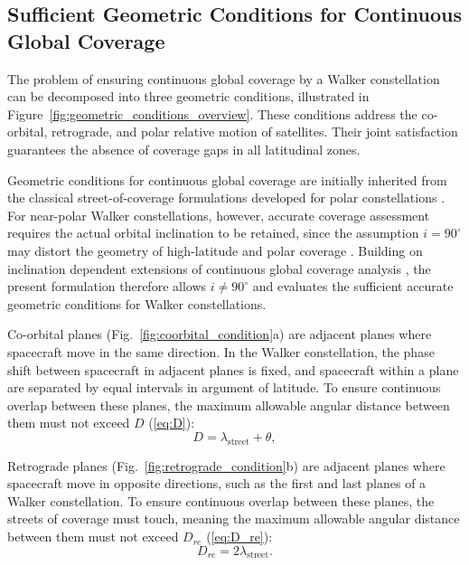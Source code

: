 \subsection{Sufficient Geometric Conditions for Continuous Global Coverage}
\label{subsec:geometric_conditions}

The problem of ensuring continuous global coverage by a Walker constellation can be 
decomposed into three geometric conditions, illustrated in Figure~\ref{fig:geometric_conditions_overview}. 
These conditions address the co-orbital, retrograde, and polar relative motion of satellites. 
Their joint satisfaction guarantees the absence of coverage gaps in all latitudinal zones.

Geometric conditions for continuous global coverage are initially inherited from the classical street-of-coverage formulations developed for polar constellations \cite{beste1978,rider1985, wertz1999smad}. For near-polar Walker constellations, however, accurate coverage assessment requires the actual orbital inclination to be retained, since the assumption \(i=90^\circ\) may distort the geometry of high-latitude and polar coverage \cite{ulybyshev1999,deweck2004}. Building on inclination dependent extensions of continuous global coverage analysis \cite{ulybyshev1999, huang2021}, the present formulation therefore allows \(i\neq90^\circ\) and evaluates the sufficient accurate geometric conditions for Walker constellations.

Co-orbital planes (Fig.~\ref{fig:coorbital_condition}a) are adjacent planes where spacecraft
move in the same direction. In the Walker constellation, the phase shift between spacecraft in
adjacent planes is fixed, and spacecraft within a plane are separated by equal intervals in
argument of latitude. To ensure continuous overlap between these planes, the maximum allowable
angular distance between them must not exceed \(D\) (\ref{eq:D}):
\begin{equation}\label{eq:D}
    D = \lambda_{\text{street}} + \theta,
\end{equation}

Retrograde planes (Fig.~\ref{fig:retrograde_condition}b) are adjacent planes where spacecraft
move in opposite directions, such as the first and last planes of a Walker constellation.
To ensure continuous overlap between these planes, the streets of coverage must touch, meaning
the maximum allowable angular distance between them must not exceed \(D_{re}\) (\ref{eq:D_re}):
\begin{equation}\label{eq:D_re}
    D_{re} = 2\lambda_{\text{street}}.
\end{equation}

